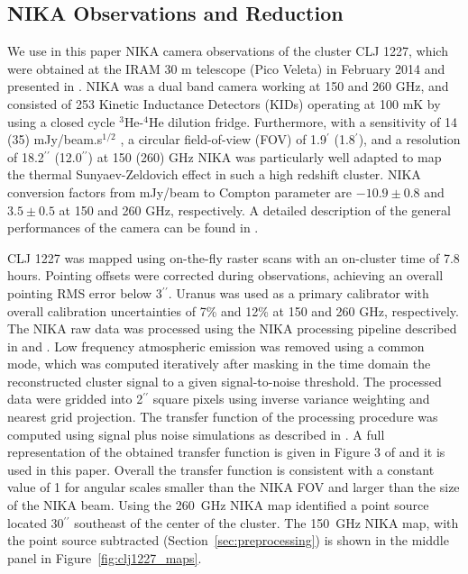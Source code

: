 \documentclass[twocolumn,traditabstract]{aa}
\begin{document}
\subsection{NIKA Observations and Reduction}
\label{sec:nikaobs}
We use in this paper NIKA camera observations of the cluster CLJ 1227, which were obtained at the IRAM 30 m telescope (Pico Veleta)
in February 2014 and presented in \citet{adam2015}. NIKA \citep{monfardini2010,monfardini2014} was a dual band camera working at 150 and
260 GHz, and consisted of 253 Kinetic Inductance Detectors (KIDs) operating at 100 mK by using a closed cycle $^3$He-$^4$He dilution fridge. 
Furthermore, with a sensitivity of 14 (35) mJy/beam.s$^{1/2}$ , a circular field-of-view (FOV) of 1.9$^{\prime}$ (1.8$^{\prime}$), and a
resolution of 18.2$^{\prime \prime}$ (12.0$^{\prime \prime}$) at 150 (260) GHz NIKA was particularly well adapted to map the thermal
Sunyaev-Zeldovich effect in such a high redshift cluster. NIKA conversion factors from mJy/beam to Compton parameter are
$-10.9 \pm 0.8$ and $3.5\pm0.5$ at 150 and 260 GHz, respectively. A detailed description of the general performances of the camera can
be found in \citet{catalano2014,adam2014}.

CLJ 1227 was mapped using on-the-fly raster scans
with an on-cluster time of 7.8 hours. Pointing offsets were corrected during observations, achieving an overall pointing RMS
error below 3$^{\prime \prime}$. Uranus was used as a primary calibrator with overall calibration uncertainties of 7\% and 12\% at
150 and 260 GHz, respectively. The NIKA raw data was processed using the NIKA processing pipeline described in \citet{adam2014} and
\citet{adam2015}. Low frequency atmospheric emission was removed using a common mode, which was computed iteratively after masking
in the time domain the reconstructed cluster signal to a given signal-to-noise threshold. 
The processed data were gridded into 2$^{\prime \prime}$ square pixels using inverse variance weighting and nearest grid projection.
The transfer function of the processing procedure was computed using signal plus noise simulations as described in \citet{adam2015}.
A full representation of the obtained transfer function is given in Figure 3 of \citet{adam2015} and it is used in this paper. Overall the transfer function is consistent with a constant value of 1 for angular scales smaller than the NIKA FOV and larger than the size of the NIKA beam. Using the 260~GHz NIKA map \citet{adam2015} identified a point source located 30$^{\prime \prime}$ southeast of the center of the cluster. The 150~GHz NIKA map, with the point source subtracted (Section~\ref{sec:preprocessing}) is shown in the middle panel
in Figure~\ref{fig:clj1227_maps}.
\end{document}
